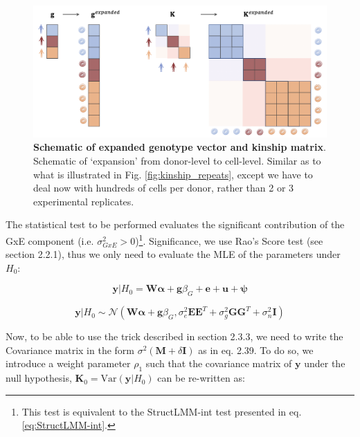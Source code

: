 \begin{figure}[h]
\centering
\includegraphics[width=15.5cm]{Chapter6/Fig/sc_structlmm_expanded.png}
\caption[Schematic of expanded genotype vector and kinship matrix]{\textbf{Schematic of expanded genotype vector and kinship matrix}.\\
Schematic of `expansion' from donor-level to cell-level.
Similar as to what is illustrated in Fig. \ref{fig:kinship_repeats}, except we have to deal now with hundreds of cells per donor, rather than 2 or 3 experimental replicates.}
\label{fig:sc_structlmm_expanded}
\end{figure}


The statistical test to be performed evaluates the significant contribution of the GxE component (i.e. $\sigma_{GxE}^2 > 0$)\footnote{This test is equivalent to the StructLMM-int test presented in eq. \eqref{eq:StructLMM-int}.}.
Significance, we 
use Rao's Score test (see section 
2.2.1), thus we only need to evaluate the MLE of the parameters 
under $H_0$:

\begin{equation}\label{eq:scStructLMM_H0}
 \mathbf{y}|H_0 =  \mathbf{W}\boldsymbol{\alpha} + \mathbf{g}\beta_G + \mathbf{e} + \mathbf{u} + \boldsymbol{\psi} 
\end{equation}

\begin{equation}\label{eq:scStructLMM_H0_MVN}
 \mathbf{y}|H_0 \sim \mathcal{N}( \mathbf{W}\boldsymbol{\alpha} + \mathbf{g}\beta_G, \sigma_e^2 \mathbf{E}\mathbf{E}^T + \sigma_g^2 \mathbf{G}\mathbf{G}^T+ \sigma_n^2 \mathbf{I} )
\end{equation}

Now, to be able to use the trick described in section 
2.3.3, 
we need to write the Covariance matrix in the form $\sigma^2(\mathbf{M}+\delta\mathbf{I})$ as in eq.
2.39.
To do so, we introduce a weight parameter $\rho_1$ such that the covariance matrix of $\mathbf{y}$ under the null hypothesis, $\mathbf{K}_0 = \mathrm{Var}(\mathbf{y} | H_0)$ can be re-written as:

